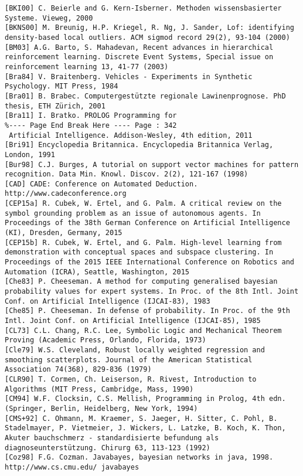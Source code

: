 \documentclass[10pt]{article}
\begin{document}
\begin{verbatim}
[BKI00] C. Beierle and G. Kern-Isberner. Methoden wissensbasierter Systeme. Vieweg, 2000
[BKNS00] M. Breunig, H.P. Kriegel, R. Ng, J. Sander, Lof: identifying density-based local outliers. ACM sigmod record 29(2), 93-104 (2000)
[BM03] A.G. Barto, S. Mahadevan, Recent advances in hierarchical reinforcement learning. Discrete Event Systems, Special issue on reinforcement learning 13, 41-77 (2003)
[Bra84] V. Braitenberg. Vehicles - Experiments in Synthetic Psychology. MIT Press, 1984
[Bra01] B. Brabec. Computergestützte regionale Lawinenprognose. PhD thesis, ETH Zürich, 2001
[Bra11] I. Bratko. PROLOG Programming for
%---- Page End Break Here ---- Page : 342
 Artificial Intelligence. Addison-Wesley, 4th edition, 2011
[Bri91] Encyclopedia Britannica. Encyclopedia Britannica Verlag, London, 1991
[Bur98] C.J. Burges, A tutorial on support vector machines for pattern recognition. Data Min. Knowl. Discov. 2(2), 121-167 (1998)
[CAD] CADE: Conference on Automated Deduction. http://www.cadeconference.org
[CEP15a] R. Cubek, W. Ertel, and G. Palm. A critical review on the symbol grounding problem as an issue of autonomous agents. In Proceedings of the 38th German Conference on Artificial Intelligence (KI), Dresden, Germany, 2015
[CEP15b] R. Cubek, W. Ertel, and G. Palm. High-level learning from demonstration with conceptual spaces and subspace clustering. In Proceedings of the 2015 IEEE International Conference on Robotics and Automation (ICRA), Seattle, Washington, 2015
[Che83] P. Cheeseman. A method for computing generalised bayesian probability values for expert systems. In Proc. of the 8th Intl. Joint Conf. on Artificial Intelligence (IJCAI-83), 1983
[Che85] P. Cheeseman. In defense of probability. In Proc. of the 9th Intl. Joint Conf. on Artificial Intelligence (IJCAI-85), 1985
[CL73] C.L. Chang, R.C. Lee, Symbolic Logic and Mechanical Theorem Proving (Academic Press, Orlando, Florida, 1973)
[Cle79] W.S. Cleveland, Robust locally weighted regression and smoothing scatterplots. Journal of the American Statistical Association 74(368), 829-836 (1979)
[CLR90] T. Cormen, Ch. Leiserson, R. Rivest, Introduction to Algorithms (MIT Press, Cambridge, Mass, 1990)
[CM94] W.F. Clocksin, C.S. Mellish, Programming in Prolog, 4th edn. (Springer, Berlin, Heidelberg, New York, 1994)
[CMS+92] C. Ohmann, M. Kraemer, S. Jaeger, H. Sitter, C. Pohl, B. Stadelmayer, P. Vietmeier, J. Wickers, L. Latzke, B. Koch, K. Thon, Akuter bauchschmerz - standardisierte befundung als diagnoseunterstützung. Chirurg 63, 113-123 (1992)
[Coz98] F.G. Cozman. Javabayes, bayesian networks in java, 1998. http://www.cs.cmu.edu/ javabayes

\end{verbatim}
\end{document}
